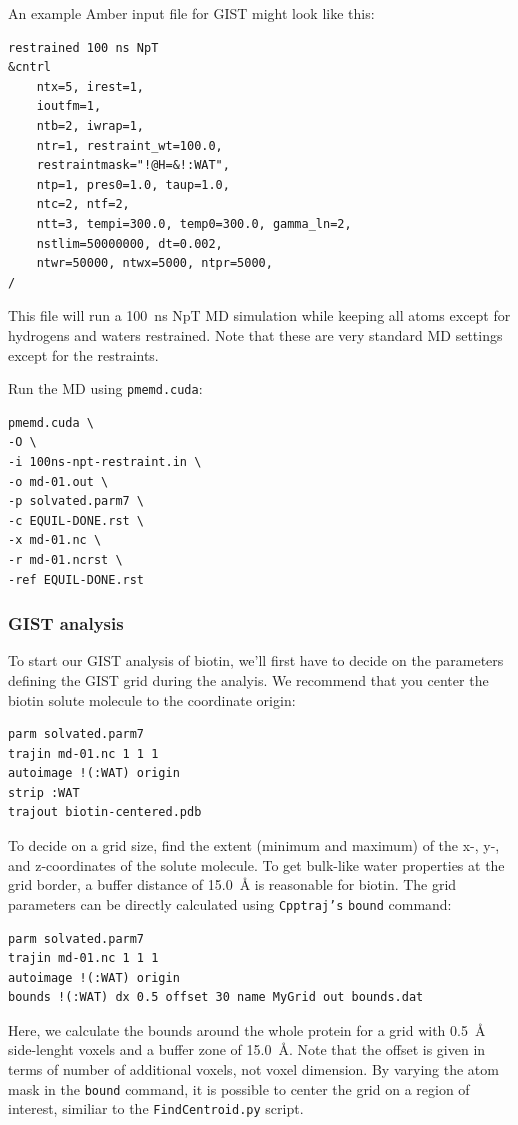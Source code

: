 \documentclass[9pt,tutorial]{livecoms}
\newcommand{\software}{\texttt}
\newcommand\inlinecode{\texttt}
\begin{document}
An example Amber input file for GIST might look like this:
\begin{lstlisting}[style=amber-in]
restrained 100 ns NpT
&cntrl
	ntx=5, irest=1,
	ioutfm=1,
	ntb=2, iwrap=1,
	ntr=1, restraint_wt=100.0,
	restraintmask="!@H=&!:WAT",
	ntp=1, pres0=1.0, taup=1.0,
	ntc=2, ntf=2,
	ntt=3, tempi=300.0, temp0=300.0, gamma_ln=2,
	nstlim=50000000, dt=0.002,
	ntwr=50000, ntwx=5000, ntpr=5000,
/
\end{lstlisting}

This file will run a \SI{100}{\nano\second} NpT MD simulation while keeping all atoms except for hydrogens and waters restrained.
Note that these are very standard MD settings except for the restraints.

Run the MD using \software{pmemd.cuda}:
\begin{lstlisting}[style=bash]
pmemd.cuda \
-O \
-i 100ns-npt-restraint.in \
-o md-01.out \
-p solvated.parm7 \
-c EQUIL-DONE.rst \
-x md-01.nc \
-r md-01.ncrst \
-ref EQUIL-DONE.rst
\end{lstlisting}
\subsubsection{GIST analysis}
To start our GIST analysis of biotin, we'll first have to decide on the parameters defining the GIST grid during the analyis.
We recommend that you center the biotin solute molecule to the coordinate origin:
\begin{lstlisting}[style=cpptraj]
parm solvated.parm7
trajin md-01.nc 1 1 1
autoimage !(:WAT) origin
strip :WAT
trajout biotin-centered.pdb
\end{lstlisting}
To decide on a grid size, find the extent (minimum and maximum) of the x-, \mbox{y-,} and z-coordinates of the solute molecule.
To get bulk-like water properties at the grid border, a buffer distance of \SI{15.0}{\angstrom} is reasonable for biotin.
The grid parameters can be directly calculated using \software{Cpptraj's} \inlinecode{bound} command:
\begin{lstlisting}[style=cpptraj]
parm solvated.parm7
trajin md-01.nc 1 1 1
autoimage !(:WAT) origin
bounds !(:WAT) dx 0.5 offset 30 name MyGrid out bounds.dat
\end{lstlisting}
Here, we calculate the bounds around the whole protein for a grid with \SI{0.5}{\angstrom} side-lenght voxels and a buffer zone of \SI{15.0}{\angstrom}. Note that the offset is given in terms of number of additional voxels, not voxel dimension. By varying the atom mask in the \inlinecode{bound} command, it is possible to center the grid on a region of interest, similiar to the \software{FindCentroid.py} script.
\end{document}
